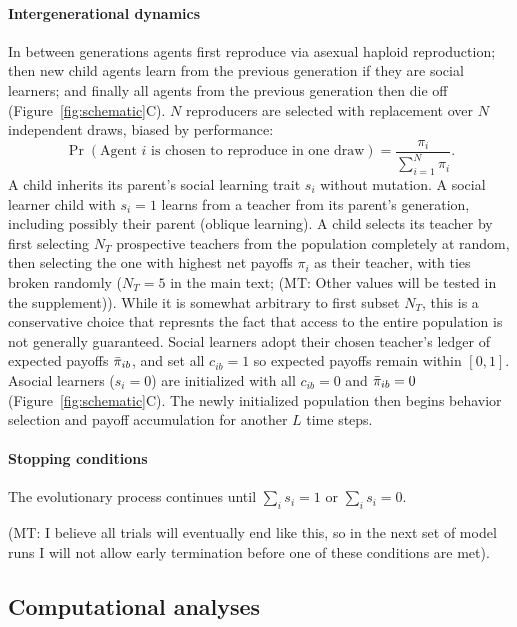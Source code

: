 \documentclass[letterpaper,11.5pt]{scrartcl}
\newcommand{\mt}[1]{{\textcolor{myorange} {({\tiny MT:} #1)}}}
\begin{document}
\paragraph{Intergenerational dynamics}
In between generations agents first reproduce via asexual haploid reproduction; 
then new child agents learn from the
previous generation if they are social learners; and finally all agents from the
previous generation then die off (Figure~\ref{fig:schematic}C). 
$N$ reproducers are selected with replacement over $N$ independent draws, 
biased by performance:
\begin{equation}
  \Pr(\text{Agent $i$ is chosen to reproduce in one draw}) = \frac{\pi_i}{\sum_{i=1}^N \pi_i}.
\end{equation}
\noindent
A child inherits its parent's social learning trait $s_i$ without mutation.
A social learner child with $s_i = 1$ learns from a teacher from its parent's
generation, including possibly their parent (oblique learning). 
A child selects its teacher by first selecting $N_T$ prospective
teachers from the population completely at random, then selecting the one with
highest net payoffs $\pi_i$ as their teacher, with ties broken randomly ($N_T =
5$ in the main text; \mt{Other values will be tested in the supplement}). While it
is somewhat arbitrary to first subset $N_T$, this is a conservative choice that
represnts the fact that access to the entire population is not generally guaranteed.
Social learners adopt their chosen teacher's ledger of expected payoffs $\bar\pi_{ib}$,
and set all $c_{ib} = 1$ so expected payoffs remain within $[0, 1]$.  Asocial
learners ($s_i = 0$) are initialized with all $c_{ib} = 0$ and $\bar\pi_{ib} = 0$ 
(Figure~\ref{fig:schematic}C). The
newly initialized population then begins behavior selection and payoff accumulation
for another $L$ time steps. 

\paragraph{Stopping conditions} The evolutionary process continues until $\sum_i s_i
= 1$ or $\sum_i s_i = 0$.

\mt{I believe all trials will eventually end like this, so
in the next set of model runs I will not allow early termination before one of these
conditions are met}.


\subsection{Computational analyses}
\end{document}
